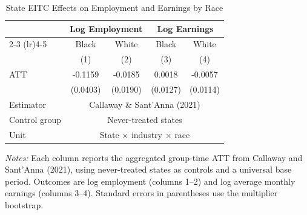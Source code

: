 \begin{table}[htbp]
\centering
\caption{State EITC Effects on Employment and Earnings by Race}
\label{tab:main}
\begin{tabular}{lcccc}
\toprule
 & \multicolumn{2}{c}{Log Employment} & \multicolumn{2}{c}{Log Earnings} \\
\cmidrule(lr){2-3} \cmidrule(lr){4-5}
 & Black & White & Black & White \\
 & (1) & (2) & (3) & (4) \\
\midrule
ATT & -0.1159 & -0.0185 & 0.0018 & -0.0057 \\
 & (0.0403) & (0.0190) & (0.0127) & (0.0114) \\
\midrule
Estimator & \multicolumn{4}{c}{Callaway \& Sant'Anna (2021)} \\
Control group & \multicolumn{4}{c}{Never-treated states} \\
Unit & \multicolumn{4}{c}{State $\times$ industry $\times$ race} \\
\bottomrule
\end{tabular}
\begin{tablenotes}
\item \textit{Notes:} Each column reports the aggregated group-time ATT from Callaway and Sant'Anna (2021), using never-treated states as controls and a universal base period. Outcomes are log employment (columns 1--2) and log average monthly earnings (columns 3--4). Standard errors in parentheses use the multiplier bootstrap.
\end{tablenotes}
\end{table}

